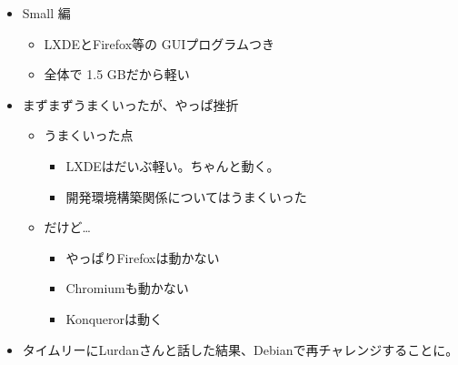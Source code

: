 \documentclass[mingoth,a4paper]{jsarticle}
\begin{document}
\begin{itemize}
 \item Small 編
       \begin{itemize}
        \item LXDEとFirefox等の GUIプログラムつき
        \item 全体で 1.5 GBだから軽い
       \end{itemize}
 \item まずまずうまくいったが、やっぱ挫折
       \begin{itemize}
        \item うまくいった点
              \begin{itemize}
               \item LXDEはだいぶ軽い。ちゃんと動く。
               \item 開発環境構築関係についてはうまくいった
              \end{itemize}
        \item だけど…
              \begin{itemize}
               \item やっぱりFirefoxは動かない
               \item Chromiumも動かない
               \item Konquerorは動く
              \end{itemize}
       \end{itemize}
 \item タイムリーにLurdanさんと話した結果、Debianで再チャレンジすることに。
\end{itemize}
\end{document}
